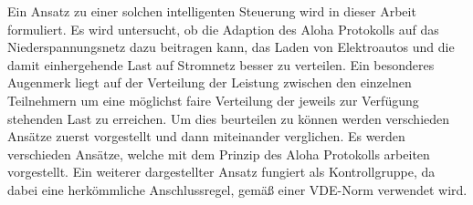 Ein Ansatz zu einer solchen intelligenten Steuerung wird in dieser Arbeit formuliert. Es wird untersucht, ob die Adaption des Aloha Protokolls auf das Niederspannungsnetz dazu beitragen kann, das Laden von Elektroautos und die damit einhergehende Last auf Stromnetz besser zu verteilen. Ein besonderes Augenmerk liegt auf der Verteilung der Leistung zwischen den einzelnen Teilnehmern um eine möglichst faire Verteilung der jeweils zur Verfügung stehenden Last zu erreichen. Um dies beurteilen zu können werden verschieden Ansätze zuerst vorgestellt und dann miteinander verglichen. Es werden verschieden Ansätze, welche mit dem Prinzip des Aloha Protokolls arbeiten vorgestellt. Ein weiterer dargestellter Ansatz fungiert als Kontrollgruppe, da dabei eine herkömmliche Anschlussregel, gemäß einer VDE-Norm verwendet wird.